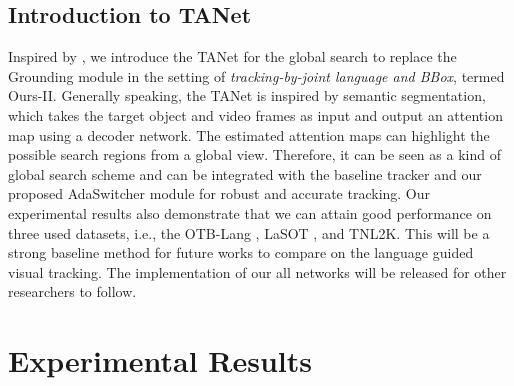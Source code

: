 \documentclass[final]{cvpr}
\begin{document}
 










\subsection{Introduction to TANet} 

Inspired by \cite{wang2019GANTrack, wang2018describe, deepMTA}, we introduce the TANet for the global search to replace the Grounding module \cite{yang2019fastgrounding} in the setting of \emph{tracking-by-joint language and BBox}, termed Ours-II. Generally speaking, the TANet is inspired by semantic segmentation, which takes the target object and video frames as input and output an attention map using a decoder network. The estimated attention maps can highlight the possible search regions from a global view. Therefore, it can be seen as a kind of global search scheme and can be integrated with the baseline tracker and our proposed AdaSwitcher module for robust and accurate tracking. Our experimental results also demonstrate that we can attain good performance on three used datasets, i.e., the OTB-Lang \cite{li2017tracking}, LaSOT \cite{fan2019lasot}, and TNL2K. This will be a strong baseline method for future works to compare on the language guided visual tracking. The implementation of our all networks will be released for other researchers to follow. 







\section{Experimental Results}  












 
\end{document}
